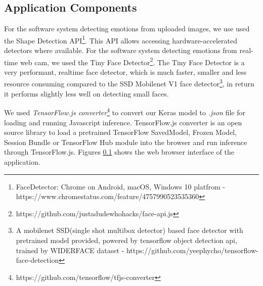 \documentclass[master]{thesis-uestc}
\begin{document}
\subsection{Application Components}
For the software system detecting emotions from uploaded images, we use used the Shape Detection API\footnote{FaceDetector: Chrome on Android, macOS, Windows 10 platfrom - https://www.chromestatus.com/feature/4757990523535360}. This API allows accessing hardware-accelerated detectors where available. For the software system detecting emotions from real-time web cam, we used the Tiny Face Detector\footnote{https://github.com/justadudewhohacks/face-api.js}. The Tiny Face Detector is a very performant, realtime face detector, which is much faster, smaller and less resource consuming compared to the SSD Mobilenet V1 face detector\footnote{A mobilenet SSD(single shot multibox detector) based face detector with pretrained model provided, powered by tensorflow object detection api, trained by WIDERFACE dataset - https://github.com/yeephycho/tensorflow-face-detection}, in return it performs slightly less well on detecting small faces.

We used \textit{TensorFlow.js converter}\footnote{https://github.com/tensorflow/tfjs-converter} to convert our Keras model to \textit{.json} file for loading and running Javascript inference. TensorFlow.js converter is an open source library to load a pretrained TensorFlow SavedModel, Frozen Model, Session Bundle or TensorFlow Hub module into the browser and run inference through TensorFlow.js. Figures \ref{} shows the web browser interface of the application.
\end{document}
